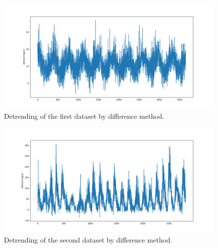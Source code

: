 \begin{figure}[H]
    \centering
    \begin{minipage}[b]{1\textwidth}
        \includegraphics[width=\textwidth]{figures/Ass1/Ass1_D1_one_diff.png}
    \end{minipage}
    \caption{Detrending of the first dataset by difference method.}
    \label{fig:Ass1_D1_one_diff}
\end{figure}

\begin{figure}[H]
    \centering
    \begin{minipage}[b]{1\textwidth}
        \includegraphics[width=\textwidth]{figures/Ass1/Ass1_D2_one_diff.png}
    \end{minipage}
    \caption{Detrending of the second dataset by difference method.}
    \label{fig:Ass1_D2_one_diff}
\end{figure}


